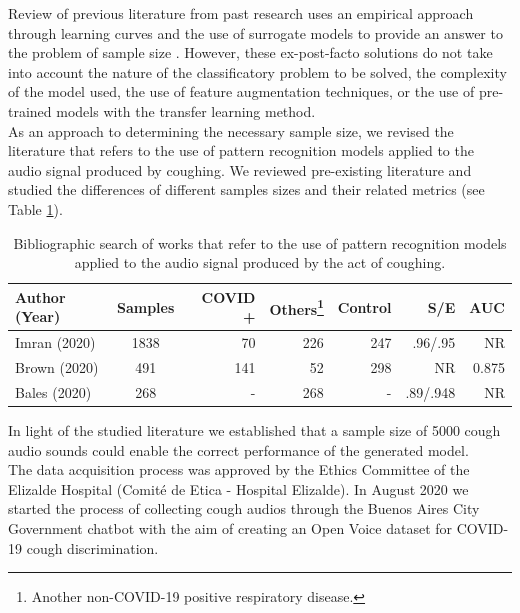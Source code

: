 \documentclass{nle}
\begin{document}
Review of previous literature from past research uses an empirical approach through learning curves and the use of surrogate models to provide an answer to the problem of sample size \cite{26}. However, these ex-post-facto solutions do not take into account the nature of the classificatory problem to be solved, the complexity of the model used, the use of feature augmentation techniques, or the use of pre-trained models with the transfer learning method.\\

As an approach to determining the necessary sample size, we revised the literature that refers to the use of pattern recognition models applied to the audio signal produced by coughing. We reviewed pre-existing literature and  studied the differences of different samples sizes and their related metrics (see Table \ref{sample-table}).\\

\begin{table}[h]
  \caption{Bibliographic search of works that refer to the use of pattern recognition models applied to the audio signal produced by the act of coughing.}
  \begin{minipage}{\textwidth}
    \begin{tabular}{lcrrrrr}
    \hline\hline
    Author (Year) & Samples & COVID + & Others\footnote{Another non-COVID-19 positive respiratory disease.}& Control & S/E & AUC\\
    \hline
    Imran (2020) & 1838 & 70 & 226 & 247 & .96/.95 & NR\\
    \noalign{\vspace {.5cm}}
    Brown (2020) & 491 & 141 & 52 & 298 & NR & 0.875\\
    \noalign{\vspace {.5cm}}
    Bales (2020) & 268 & - & 268 & - & .89/.948 & NR\\
    \hline\hline
    \end{tabular}
    \vspace{-2\baselineskip}
  \end{minipage}
  \label{sample-table}
\end{table}

In light of the studied literature we established that a sample size of 5000 cough audio sounds could enable the correct performance of the generated model.\\

The data acquisition process  was approved by the Ethics Committee of the Elizalde Hospital (Comité de Etica - Hospital Elizalde). In August 2020 we started the process of collecting cough audios through the Buenos Aires City Government chatbot with the aim of creating an Open Voice dataset for COVID-19 cough discrimination.\\
\end{document}
